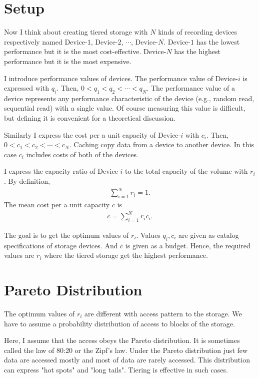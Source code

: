 \documentclass[a4paper,11pt]{article}
\begin{document}
\section{Setup}


Now I think about creating tiered storage with $N$ kinds of recording
devices respectively named Device-$1$, Device-$2$, $\cdots$, Device-$N$.
Device-$1$ has the lowest performance but it is the most cost-effective.
Device-$N$ has the highest performance but it is the most expensive.


I introduce performance values of devices. The performance value of
Device-$i$ is expressed with $q_i$. Then, $0 < q_1 < q_2 <
\cdots < q_N$. The performance value of a device represents any
performance characteristic of the device (e.g., random read, sequential
read) with a single value. Of course measuring this value is
difficult, but defining it is convenient for a theoretical discussion.


Similarly I express the cost per a unit capacity of Device-$i$ with
$c_i$. Then, $0 < c_1 < c_2 < \cdots < c_N$. Caching copy
data from a device to another device. In this case $c_i$ includes costs
of both of the devices.


I express the capacity ratio of Device-$i$ to the total capacity of the
volume with $r_i$. By definition,
\begin{eqnarray}
  \sum_{i=1}^N r_i = 1. \label{sum_ratio}
\end{eqnarray}
The mean cost per a unit capacity $\bar{c}$ is
\begin{eqnarray}
  \bar{c}=\sum_{i=1}^N r_i c_i. \label{mean_cost}
\end{eqnarray}


The goal is to get the optimum values of $r_i$. Values $q_i, c_i$ are
given as catalog specifications of storage devices. And $\bar{c}$ is
given as a budget. Hence, the required values are $r_i$ where the tiered
storage get the highest performance.


\section{Pareto Distribution}


The optimum values of $r_i$ are different with access pattern to the
storage. We have to assume a probability distribution of access to
blocks of the storage.


Here, I assume that the access obeys the Pareto distribution. It is
sometimes called the law of 80:20 or the Zipf's law. Under the Pareto
distribution just few data are accessed mostly and most of data are
rarely accessed. This distribution can express "hot spots" and "long
tails". Tiering is effective in such cases.
\end{document}
